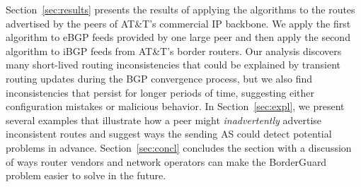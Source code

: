 Section~\ref{sec:results} presents the results of applying the
algorithms to the routes advertised by the peers of AT\&T's commercial
IP backbone.  We apply the first algorithm to eBGP feeds provided by
one large peer and then apply the second algorithm to iBGP feeds from
AT\&T's border routers.  Our analysis discovers many short-lived
routing inconsistencies that could be explained by transient routing
updates during the BGP convergence process, but we also find
inconsistencies that persist for longer periods of time, suggesting
either configuration mistakes or malicious behavior.  In
Section~\ref{sec:expl}, we present several examples that illustrate
how a peer might {\em inadvertently\/} advertise inconsistent routes
and suggest ways the sending AS could detect potential problems in advance.
Section~\ref{sec:concl} concludes the section with a discussion of ways
router vendors and network operators can make the BorderGuard problem
easier to solve in the future.
